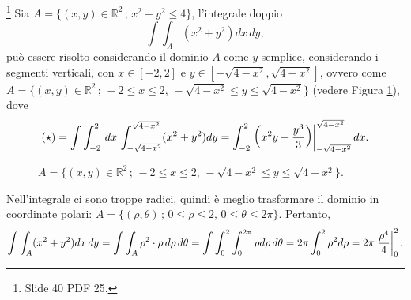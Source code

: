 \begin{example}\footnote{Slide 40 PDF 25.}
	Sia $A=\{(x,y)\in\mathbb{R}^2\,;\, x^2+y^2\leq 4\}$, l'integrale doppio
	\begin{equation*}
		\int\int_A(x^2+y^2)dx\, dy,
	\end{equation*}
	può essere risolto considerando il dominio $A$ come $y$-semplice, considerando i segmenti verticali, con $x\in[-2,2]$ e $y\in[-\sqrt{4-x^2},\sqrt{4-x^2}]$, ovvero come $A=\{(x,y)\in\mathbb{R}^2\,;\, -2\leq x\leq 2,\, -\sqrt{4-x^2}\leq y\leq \sqrt{4-x^2}\}$ (vedere Figura \ref{fig:esempio_dominio_radici}), dove
	\begin{equation*}
		(\star) = \int\int_{-2}^2 \, dx\, \int_{-\sqrt{4-x^2}}^{\sqrt{4-x^2}} (x^2 + y^2) dy = \int_{-2}^2\left.\left(x^2y + \frac{y^3}{3}\right)\right\rvert_{-\sqrt{4-x^2}}^{\sqrt{4-x^2}}dx.
	\end{equation*}
	\begin{figure}[ht]
		\centering
		\caption{$A=\{(x,y)\in\mathbb{R}^2\,;\, -2\leq x\leq 2,\, -\sqrt{4-x^2}\leq y\leq \sqrt{4-x^2}\}$.}
		\label{fig:esempio_dominio_radici}
	\end{figure}
	
	Nell'integrale ci sono troppe radici, quindi è meglio trasformare il dominio in coordinate polari: $\tilde{A} = \{(\rho,\theta)\,;\, 0\leq \rho\leq 2,\, 0\leq \theta\leq 2\pi\}$. Pertanto,
	\begin{equation*}
		\int\int_A(x^2+y^2)dx\, dy = \int\int_{\tilde{A}} \rho^2\cdot\rho\, d\rho\,d\theta =\int\int_0^2\int_0^{2\pi} \rho d\rho\, d\theta = 2\pi\int_0^2\rho^2 d\rho = 2\pi\left.\frac{\rho^4}{4}\right\rvert_{0}^{2}.
	\end{equation*}
\end{example}

